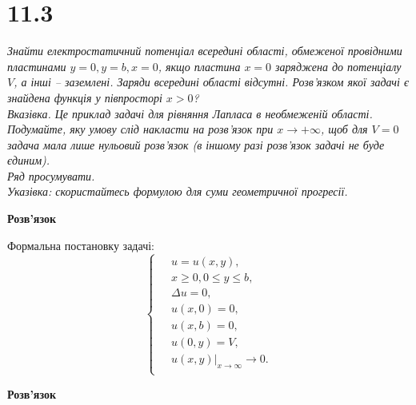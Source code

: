 


%


\section[Задача №11.3]{11.3}

\textit{Знайти електростатичний потенціал всередині області, обмеженої провідними пластинами $y=0, y=b, x=0$, якщо пластина $x=0$ заряджена до потенціалу $V$, а інші -- заземлені. Заряди всередині області відсутні. Розв’язком якої задачі є знайдена функція у півпросторі $x>0$?\\
Вказівка. Це приклад задачі для рівняння Лапласа в необмеженій області. Подумайте, яку умову слід накласти на розв’язок при
$x \to +\infty$, щоб для $V=0$ задача мала лише нульовий розв’язок (в іншому разі розв’язок задачі не буде єдиним).\\
Ряд просумувати.\\
Указівка: скористайтесь формулою для суми геометричної прогресії.}

\begin{center}
    \large{\textbf{Розв'язок}}
\end{center}

Формальна постановку задачі:
\begin{equation} \label{cond11,3}
    \left\{ \begin{aligned} 
        \;&u = u(x,y), \\
          &x \geq 0,0 \leq y \leq b, \\
          &\Delta u = 0, \\
          &u(x,0) = 0,\\ &u(x,b) = 0,\\
          &u(0,y) = V,\\ &u(x,y)\big|_{x\to\infty} \to 0.\\
    \end{aligned} \right.
\end{equation}

\begin{center}
    \large{\textbf{Розв'язок}}
\end{center}

